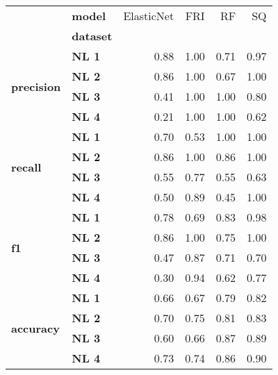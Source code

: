 \begin{tabular}{llrrrr}
\toprule
         & \textbf{model} &  ElasticNet &  FRI &   RF &   SQ \\
{} & \textbf{dataset} &             &      &      &      \\
\midrule
\multirow{4}{*}{\textbf{precision}} & \textbf{NL 1} &        0.88 & 1.00 & 0.71 & 0.97 \\
         & \textbf{NL 2} &        0.86 & 1.00 & 0.67 & 1.00 \\
         & \textbf{NL 3} &        0.41 & 1.00 & 1.00 & 0.80 \\
         & \textbf{NL 4} &        0.21 & 1.00 & 1.00 & 0.62 \\
\cline{1-6}
\multirow{4}{*}{\textbf{recall}} & \textbf{NL 1} &        0.70 & 0.53 & 1.00 & 1.00 \\
         & \textbf{NL 2} &        0.86 & 1.00 & 0.86 & 1.00 \\
         & \textbf{NL 3} &        0.55 & 0.77 & 0.55 & 0.63 \\
         & \textbf{NL 4} &        0.50 & 0.89 & 0.45 & 1.00 \\
\cline{1-6}
\multirow{4}{*}{\textbf{f1}} & \textbf{NL 1} &        0.78 & 0.69 & 0.83 & 0.98 \\
         & \textbf{NL 2} &        0.86 & 1.00 & 0.75 & 1.00 \\
         & \textbf{NL 3} &        0.47 & 0.87 & 0.71 & 0.70 \\
         & \textbf{NL 4} &        0.30 & 0.94 & 0.62 & 0.77 \\
\cline{1-6}
\multirow{4}{*}{\textbf{accuracy}} & \textbf{NL 1} &        0.66 & 0.67 & 0.79 & 0.82 \\
         & \textbf{NL 2} &        0.70 & 0.75 & 0.81 & 0.83 \\
         & \textbf{NL 3} &        0.60 & 0.66 & 0.87 & 0.89 \\
         & \textbf{NL 4} &        0.73 & 0.74 & 0.86 & 0.90 \\
\bottomrule
\end{tabular}
